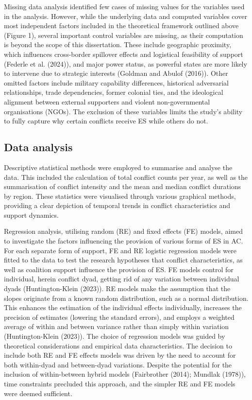 \documentclass[
]{article}
\begin{document}
Missing data analysis identified few cases of missing values for the
variables used in the analysis. However, while the underlying data and
computed variables cover most independent factors included in the
theoretical framework outlined above (Figure 1), several important
control variables are missing, as their computation is beyond the scope
of this dissertation. These include geographic proximity, which
influences cross-border spillover effects and logistical feasibility of
support (Federle et al. (2024)), and major power status, as powerful
states are more likely to intervene due to strategic interests (Goldman
and Abulof (2016)). Other omitted factors include military capability
differences, historical adversarial relationships, trade dependencies,
former colonial ties, and the ideological alignment between external
supporters and violent non-governmental organisations (NGOs). The
exclusion of these variables limits the study's ability to fully capture
why certain conflicts receive ES while others do not.

\subsection{Data analysis}\label{data-analysis}

Descriptive statistical methods were employed to summarise and analyse
the data. This included the calculation of total conflict counts per
year, as well as the summarisation of conflict intensity and the mean
and median conflict durations by region. These statistics were
visualised through various graphical methods, providing a clear
depiction of temporal trends in conflict characteristics and support
dynamics.

Regression analysis, utilising random (RE) and fixed effects (FE)
models, aimed to investigate the factors influencing the provision of
various forms of ES in AC. For each separate form of support, FE and RE
logistic regression models were fitted to the data to test the research
hypotheses that conflict characteristics, as well as coalition support
influence the provision of ES. FE models control for individual, herein
conflict dyad, getting rid of any variation between individual dyads
(Huntington-Klein (2023)). RE models make the assumption that the slopes
originate from a known random distribution, such as a normal
distribution. This enhances the estimation of the individual effects
individually, increases the precision of estimates (lowering the
standard errors), and employs a weighted average of within and between
variance rather than simply within variation (Huntington-Klein (2023)).
The choice of regression models was guided by theoretical considerations
and empirical data characteristics. The decision to include both RE and
FE effects models was driven by the need to account for both within-dyad
and between-dyad variations. Despite the potential for the inclusion of
within-between hybrid models (Fairbrother (2014); Mundlak (1978)), time
constraints precluded this approach, and the simpler RE and FE models
were deemed sufficient.
\end{document}
